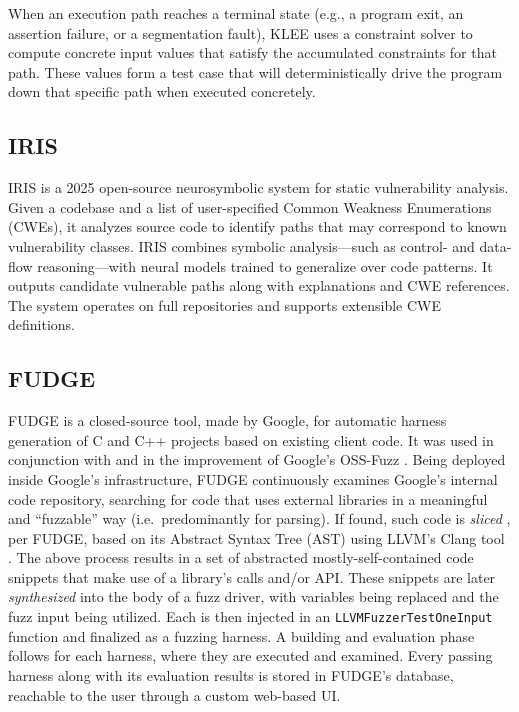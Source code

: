 \documentclass[
  a4paper,
]{scrreprt}
\theoremstyle{definition}
\theoremstyle{remark}
\begin{document}
When an execution path reaches a terminal state (e.g., a program exit,
an assertion failure, or a segmentation fault), KLEE uses a constraint
solver to compute concrete input values that satisfy the accumulated
constraints for that path. These values form a test case that will
deterministically drive the program down that specific path when
executed concretely.

\subsection{IRIS}\label{iris}

IRIS \autocite{iris} is a 2025 open-source neurosymbolic system for
static vulnerability analysis. Given a codebase and a list of
user-specified Common Weakness Enumerations (CWEs), it analyzes source
code to identify paths that may correspond to known vulnerability
classes. IRIS combines symbolic analysis---such as control- and
data-flow reasoning---with neural models trained to generalize over code
patterns. It outputs candidate vulnerable paths along with explanations
and CWE references. The system operates on full repositories and
supports extensible CWE definitions.

\subsection{FUDGE}\label{fudge}

FUDGE \autocite{fudge} is a closed-source tool, made by Google, for
automatic harness generation of C and C++ projects based on existing
client code. It was used in conjunction with and in the improvement of
Google's OSS-Fuzz \autocite{oss-fuzz}. Being deployed inside Google's
infrastructure, FUDGE continuously examines Google's internal code
repository, searching for code that uses external libraries in a
meaningful and ``fuzzable'' way (i.e.~predominantly for parsing). If
found, such code is \emph{sliced} \autocite{sasirekha2011Slicing}, per
FUDGE, based on its Abstract Syntax Tree (AST) using LLVM's Clang tool
\autocite{llvm}. The above process results in a set of abstracted
mostly-self-contained code snippets that make use of a library's calls
and/or API. These snippets are later \emph{synthesized} into the body of
a fuzz driver, with variables being replaced and the fuzz input being
utilized. Each is then injected in an \texttt{LLVMFuzzerTestOneInput}
function and finalized as a fuzzing harness. A building and evaluation
phase follows for each harness, where they are executed and examined.
Every passing harness along with its evaluation results is stored in
FUDGE's database, reachable to the user through a custom web-based UI.
\end{document}
